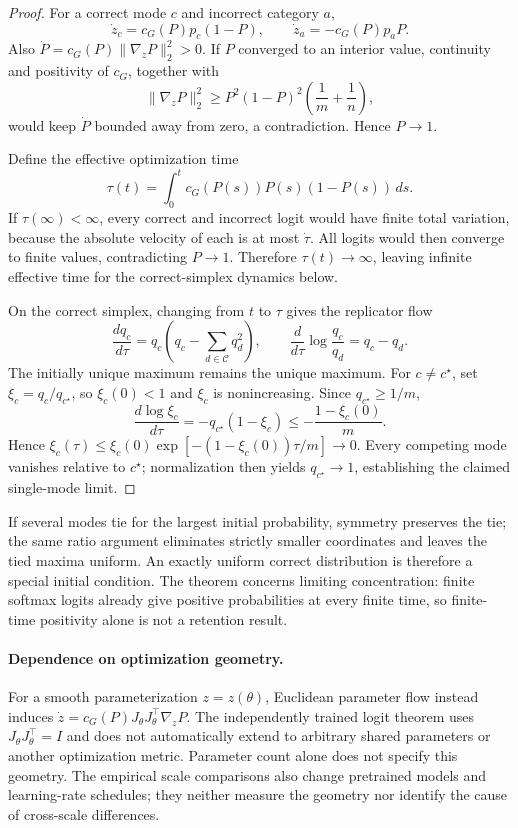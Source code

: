 \documentclass{article}
\newcommand{\1}{\mathbf 1}
\theoremstyle{remark}
\theoremstyle{definition}
\theoremstyle{plain}
\begin{document}
\begin{proof}
For a correct mode $c$ and incorrect category $a$,
\[
  \dot z_c=c_G(P)p_c(1-P),
  \qquad
  \dot z_a=-c_G(P)p_aP.
\]
Also $\dot P=c_G(P)\lVert\nabla_zP\rVert_2^2>0$. If $P$ converged to an
interior value, continuity and positivity of $c_G$, together with
\[
 \lVert\nabla_zP\rVert_2^2
 \ge P^2(1-P)^2\left(\frac1m+\frac1n\right),
\]
would keep $\dot P$ bounded away from zero, a contradiction. Hence $P\to1$.

Define the effective optimization time
\[
  \tau(t)=\int_0^t c_G(P(s))P(s)(1-P(s))\,ds.
\]
If $\tau(\infty)<\infty$, every correct and incorrect logit would have finite
total variation, because the absolute velocity of each is at most $\dot\tau$.
All logits would then converge to finite values, contradicting $P\to1$.
Therefore $\tau(t)\to\infty$, leaving infinite effective time for the
correct-simplex dynamics below.

On the correct simplex, changing from $t$ to $\tau$ gives the replicator flow
\begin{equation}
  \frac{dq_c}{d\tau}
  =q_c\left(q_c-\sum_{d\in\mathcal C}q_d^2\right),
  \qquad
  \frac{d}{d\tau}\log\frac{q_c}{q_d}=q_c-q_d.
  \label{eq:grpo-replicator}
\end{equation}
The initially unique maximum remains the unique maximum. For $c\ne c^\star$,
set $\xi_c=q_c/q_{c^\star}$, so $\xi_c(0)<1$ and $\xi_c$ is nonincreasing.
Since $q_{c^\star}\ge1/m$,
\[
 \frac{d\log\xi_c}{d\tau}
 =-q_{c^\star}(1-\xi_c)
 \le-\frac{1-\xi_c(0)}{m}.
\]
Hence $\xi_c(\tau)\le\xi_c(0)\exp[-(1-\xi_c(0))\tau/m]\to0$.
Every competing mode vanishes relative to $c^\star$; normalization then
yields $q_{c^\star}\to1$, establishing the claimed single-mode limit.
\end{proof}

If several modes tie for the largest initial probability, symmetry preserves
the tie; the same ratio argument eliminates strictly smaller coordinates and
leaves the tied maxima uniform. An exactly uniform correct distribution is
therefore a special initial condition. The theorem concerns limiting
concentration: finite softmax logits already give positive probabilities at
every finite time, so finite-time positivity alone is not a retention result.

\paragraph{Dependence on optimization geometry.}
For a smooth parameterization $z=z(\theta)$, Euclidean parameter flow instead
induces $\dot z=c_G(P)J_\theta J_\theta^\top\nabla_zP$. The independently
trained logit theorem uses $J_\theta J_\theta^\top=I$ and does not automatically
extend to arbitrary shared parameters or another optimization metric.
Parameter count alone does not specify this geometry. The empirical scale
comparisons also change pretrained models and learning-rate schedules; they
neither measure the geometry nor identify the cause of cross-scale differences.
\end{document}
